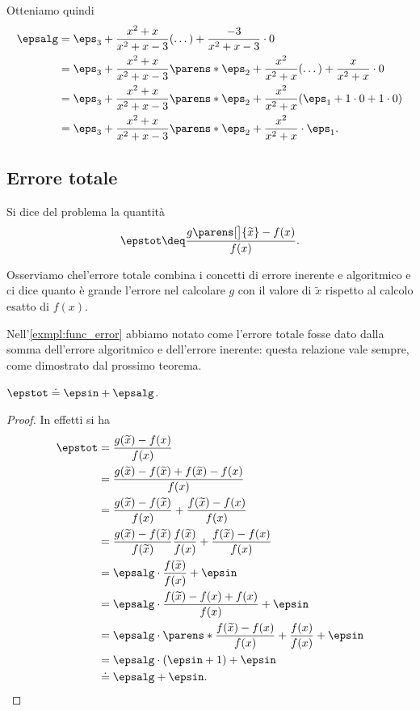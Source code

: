 \begin{example}
    Otteniamo quindi \begin{align*}
        \epsalg &= \eps_3 + \frac{x^2 + x}{x^2+x-3}(\dots) + \frac{-3}{x^2+x-3}\cdot 0\\
        &= \eps_3 + \frac{x^2 + x}{x^2+x-3}\parens*{\eps_2 + \frac{x^2}{x^2+x}(\dots) + \frac{x}{x^2+x}\cdot 0}\\
        &= \eps_3 + \frac{x^2 + x}{x^2+x-3} \parens*{\eps_2 + \frac{x^2}{x^2+x}(\eps_1 + 1\cdot 0 + 1 \cdot 0)}\\
        &= \eps_3 + \frac{x^2 + x}{x^2+x-3} \parens*{\eps_2 + \frac{x^2}{x^2+x} \cdot \eps_1}.
    \end{align*}
\end{example}

\subsection{Errore totale}

\begin{definition}
        Si dice  del problema la quantità \[
            \epstot \deq \frac{g\parens[\big]{\tilde x} - f(x)}{f(x)}.
        \]
\end{definition}

Osserviamo chel'errore totale combina i concetti di errore inerente e algoritmico e ci dice quanto è grande l'errore nel calcolare $g$ con il valore di $\tilde x$ rispetto al calcolo esatto di $f(x)$.


Nell'\autoref{exmpl:func_error} abbiamo notato come l'errore totale fosse dato dalla somma dell'errore algoritmico e dell'errore inerente: questa relazione vale sempre, come dimostrato dal prossimo teorema.

\begin{theorem}
    \label{th:relation_eps_tot/alg/in}
    $\epstot \doteq \epsin + \epsalg$.
\end{theorem}
\begin{proof}
    In effetti si ha \begin{align*}
        \epstot &= \frac{g(\tilde x) - f(x)}{f(x)}\\
        &= \frac{g(\tilde x) - f(\tilde x) + f(\tilde x) - f(x)}{f(x)} \\ %
        &= \frac{g(\tilde x) - f(\tilde x)}{f(x)} + \frac{f(\tilde x) - f(x)}{f(x)}\\
        &= \frac{g(\tilde x) - f(\tilde x)}{f(\tilde x)}\frac{f(\tilde x)}{f(x)} + \frac{f(\tilde x) - f(x)}{f(x)}\\
        &= \epsalg \cdot \frac{f(\tilde x)}{f(x)} + \epsin\\
        &= \epsalg \cdot \frac{f(\tilde x) - f(x) + f(x)}{f(x)} + \epsin\\
        &= \epsalg \cdot \parens*{ \frac{f(\tilde x) - f(x)}{f(x)} + \frac{f(x)}{f(x)} } + \epsin\\
        &= \epsalg \cdot (\epsin + 1) + \epsin\\
        &\doteq \epsalg + \epsin. \qedhere
    \end{align*}
\end{proof}

